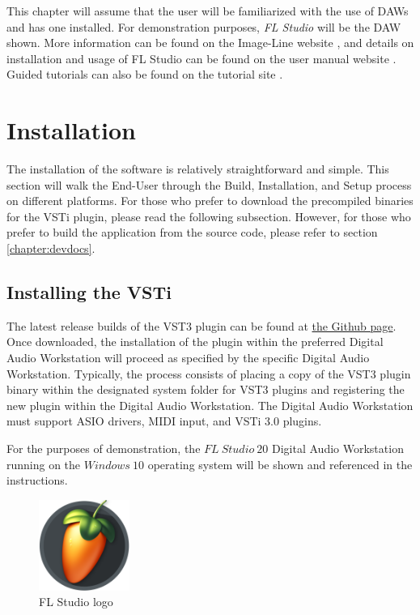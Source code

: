 \documentclass[a4paper,12pt]{report}
\begin{document}
This chapter will assume that the user will be familiarized with the use of DAWs and has one installed. For demonstration purposes, \emph{FL Studio} will be the DAW shown. More information can be found on the Image-Line website \cite{floverview}, and details on installation and usage of FL Studio can be found on the user manual website \cite{flmanual}. Guided tutorials can also be found on the tutorial site \cite{fltutorials}.

\section{Installation}
\label{sec:installation}
The installation of the software is relatively straightforward and simple. This section will walk the End-User through the Build, Installation, and Setup process on different platforms. For those who prefer to download the precompiled binaries for the VSTi plugin, please read the following subsection. However, for those who prefer to build the application from the source code, please refer to section \ref{chapter:devdocs}.

\subsection{Installing the VSTi}
\label{subsec:installvsti}
The latest release builds of the VST3 plugin can be found at \href{https://github.com/ParadoxChains/C3JI5D-Evan-Sitt-BSc-Thesis/tree/master/Release\%20Builds}{the Github page}\cite{github}. Once downloaded, the installation of the plugin within the preferred Digital Audio Workstation will proceed as specified by the specific Digital Audio Workstation. Typically, the process consists of placing a copy of the VST3 plugin binary within the designated system folder for VST3 plugins and registering the new plugin within the Digital Audio Workstation. The Digital Audio Workstation must support ASIO drivers, MIDI input, and VSTi 3.0 plugins.

For the purposes of demonstration, the $FL\ Studio\ 20$ Digital Audio Workstation running on the $Windows\ 10$ operating system will be shown and referenced in the instructions.

\begin{figure}[h] \centering
\includegraphics[width=8em]{FLStudioLogo.png}
    \caption{FL Studio logo}     \label{fig:FLLogo} \end{figure}
\end{document}
